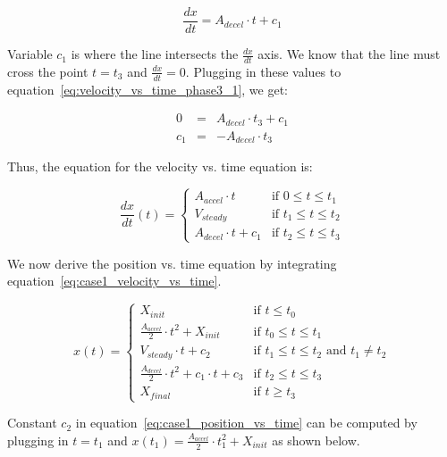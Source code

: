 \documentclass[11pt]{article} %
\begin{document}
\begin{equation}
\frac{dx}{dt} = A_{decel} \cdot t + c_1
\label{eq:velocity_vs_time_phase3_1}
\end{equation}

\noindent Variable $c_1$ is where the line intersects the $\frac{dx}{dt}$ axis.  We know that the line must cross the point $t = t_3$ and $\frac{dx}{dt} = 0$. Plugging in these values to equation~\ref{eq:velocity_vs_time_phase3_1}, we get:

\begin{eqnarray}
0 & = & A_{decel} \cdot t_3 + c_1\nonumber \\
c_1 & = & -A_{decel} \cdot t_3
\end{eqnarray}

\noindent Thus, the equation for the velocity vs. time equation is:

\begin{equation}
\frac{dx}{dt}(t) = \left\{
  \begin{array}{rl}
     A_{accel}  \cdot t & \text{if } 0 \le t \le t_1\\
    V_{steady} & \text{if } t_1 \le t \le t_2 \\
     A_{decel}  \cdot t + c_1 & \text{if } t_2 \le t \le t_3
  \end{array} \right.
\label{eq:case1_velocity_vs_time}
\end{equation}

\noindent We now derive the position vs. time equation by integrating equation~\ref{eq:case1_velocity_vs_time}.

\begin{equation}
x(t) = \left\{
  \begin{array}{rl}
    X_{init} &  \text{if }  t  \le t_0\\
    \frac{A_{accel}}{2} \cdot t^{2} + X_{init} &  \text{if } t_0 \le t \le t_1\\
    V_{steady} \cdot t + c_2 & \text{if } t_1 \le t \le t_2 \text{~and~} t_1 \ne t_2\\
    \frac{A_{decel}}{2} \cdot t^{2} + c_1 \cdot t + c_3 & \text{if } t_2 \le t \le t_3 \\
     X_{final} & \text{if } t \ge t_3
  \end{array} \right.
 \label{eq:case1_position_vs_time}
\end{equation}

\noindent Constant $c_2$ in equation~\ref{eq:case1_position_vs_time} can be computed by plugging in $t = t_1$ and $x(t_1) = \frac{A_{accel}}{2} \cdot t_1^2 + X_{init}$ as shown below.
\end{document}
